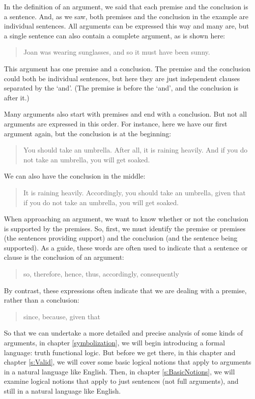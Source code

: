 In the definition of an argument, we said that each premise and the conclusion is a sentence. And, as we saw, both premises and the conclusion in the example are individual sentences. All arguments can be expressed this way and many are, but a single sentence can also contain a complete argument, as is shown here:
	\begin{quote}
		 Joan was wearing sunglasses, and so it must have been sunny.
	\end{quote}
This argument has one premise and a conclusion. The premise and the conclusion could both be individual sentences, but here they are just independent clauses separated by the `and'. (The premise is before the `and', and the conclusion is after it.)

Many arguments also start with premises and end with a conclusion. But not all arguments are expressed in this order. For instance, here we have our first argument again, but the conclusion is at the beginning:
	\begin{quote}
		You should take an umbrella. After all, it is raining heavily. And if you do not take an umbrella, you will get soaked. 
	\end{quote}
We can also have the conclusion in the middle:
	\begin{quote}
		It is raining heavily. Accordingly, you should take an umbrella, given that if you do not take an umbrella, you will get soaked.
	\end{quote}

When approaching an argument, we want to know whether or not the conclusion is supported by the premises. So, first, we must identify the premise or premises (the sentences providing support) and the conclusion (and the sentence being supported). As a guide, these words are often used to indicate that a sentence or clause is the conclusion of an argument:
	\begin{quote}
		so, therefore, hence, thus, accordingly, consequently
	\end{quote}
By contrast, these expressions often indicate that we are dealing with a premise, rather than a conclusion:
	\begin{quote}
		since, because, given that
	\end{quote}

So that we can undertake a more detailed and precise analysis of some kinds of arguments, in chapter \ref{symbolization}, we will begin introducing a formal language: truth functional logic. But before we get there, in this chapter and chapter \ref{s:Valid}, we will cover some basic logical notions that apply to arguments in a natural language like English. Then, in chapter \ref{s:BasicNotions},  we will examine logical notions that apply to just sentences (not full arguments), and still in a natural language like English.


